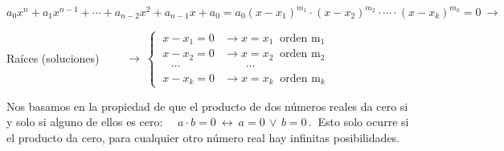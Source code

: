 \vspace{5mm}

$a_0x^n+a_1x^{n-1}+\cdots +a_{n-2}x^2+a_{n-1}x+a_0= a_0(x-x_1)^{m_1}\cdot (x-x_2)^{m_2}\cdot \cdots \cdot (x-x_k)^{m_k} = 0 \ \to \ $

Raíces (soluciones) $\qquad \to \ \begin{cases}
\ x-x_1=0 &\to x=x_1 \ \text{ orden m}_1 \\
\ x-x_2=0 &\to x=x_2 \ \text{ orden m}_2 \\
\quad \cdots & \quad \quad \cdots \\
\ x-x_k=0 &\to x=x_k \ \text{ orden m}_k	
 \end{cases}$	


\vspace{2mm} \textcolor{gris}{Nos basamos en la propiedad de que el producto de dos números reales da cero si y solo si alguno de ellos es cero: 
$\quad a \cdot b = 0 \ \leftrightarrow \ a=0 \, \vee \, b=0 \, . \ $ Esto solo ocurre si el producto da cero, para cualquier otro número real hay infinitas posibilidades.}

